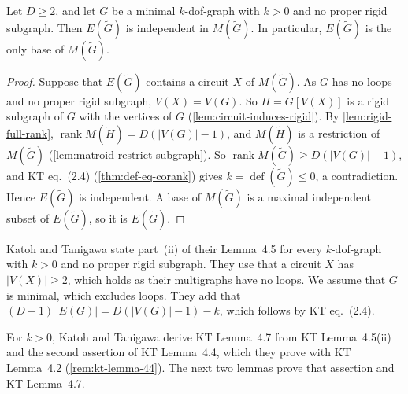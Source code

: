 \begin{lemma}
  \label{lem:edge-set-indep-pos}
  \leanok
  Let $D \ge 2$, and let $G$ be a minimal $k$-dof-graph with $k > 0$ and
  no proper rigid subgraph. Then $E(\tilde G)$ is independent in
  $M(\tilde G)$. In particular, $E(\tilde G)$ is the only base of
  $M(\tilde G)$.
\end{lemma}
\begin{proof}
  \leanok
  Suppose that $E(\tilde G)$ contains a circuit $X$ of $M(\tilde G)$. As
  $G$ has no loops and no proper rigid subgraph, $V(X) = V(G)$. So
  $H = G[V(X)]$ is a rigid subgraph of $G$ with the vertices of $G$
  (\cref{lem:circuit-induces-rigid}). By \cref{lem:rigid-full-rank},
  $\operatorname{rank} M(\tilde H) = D(|V(G)| - 1)$, and $M(\tilde H)$ is
  a restriction of $M(\tilde G)$ (\cref{lem:matroid-restrict-subgraph}).
  So $\operatorname{rank} M(\tilde G) \ge D(|V(G)| - 1)$, and KT
  eq.~(2.4) (\cref{thm:def-eq-corank}) gives
  $k = \operatorname{def}(\tilde G) \le 0$, a contradiction. Hence
  $E(\tilde G)$ is independent. A base of $M(\tilde G)$ is a maximal
  independent subset of $E(\tilde G)$, so it is $E(\tilde G)$.
\end{proof}

Katoh and Tanigawa state part~(ii) of their Lemma~4.5 for every
$k$-dof-graph with $k > 0$ and no proper rigid subgraph. They use that
a circuit $X$ has $|V(X)| \ge 2$, which holds as their multigraphs have
no loops. We assume that $G$ is minimal, which excludes loops. They add that $(D-1)\,|E(G)| = D(|V(G)| - 1) - k$,
which follows by KT eq.~(2.4).

For $k > 0$, Katoh and Tanigawa derive KT Lemma~4.7 from KT
Lemma~4.5(ii) and the second assertion of KT Lemma~4.4, which they prove
with KT Lemma~4.2 (\cref{rem:kt-lemma-44}). The next two lemmas prove
that assertion and KT Lemma~4.7.

